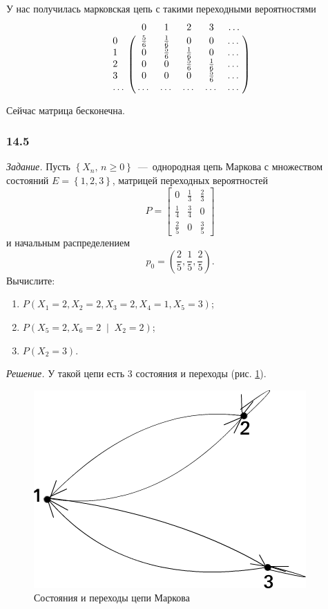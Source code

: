 \begin{enumerate}[label=\alph*)]
  У нас получилась марковская цепь с такими переходными вероятностями
  \begin{equation*}
    \bordermatrix{~ & 0 & 1 & 2 & 3 & \dotsc \cr
                  0 & \frac{5}{6} & \frac{1}{6} & 0 & 0 & \dotsc \cr
                  1 & 0 & \frac{5}{6} & \frac{1}{6} & 0 & \dotsc \cr
                  2 & 0 & 0 & \frac{5}{6} & \frac{1}{6} & \dotsc \cr
                  3 & 0 & 0 & 0 & \frac{5}{6} & \dotsc \cr
                  \dotsc & \dotsc & \dotsc & \dotsc & \dotsc & \dotsc \cr}
  \end{equation*}

  Сейчас матрица бесконечна.
\end{enumerate}

\subsubsection*{14.5}

\textit{Задание.}
Пусть $ \left\{ X_n, \, n \geq 0 \right\} $~---~однородная цепь Маркова с множеством состояний
$E = \left\{ 1, 2, 3 \right\} $, матрицей переходных вероятностей
\begin{equation*}
  P =
  \begin{bmatrix}
    0 & \frac{1}{3} & \frac{2}{3} \\
    \frac{1}{4} & \frac{3}{4} & 0 \\
    \frac{2}{5} & 0 & \frac{3}{5}
  \end{bmatrix}
\end{equation*}
и начальным распределением
\begin{equation*}
  p_0 =
  \left( \frac{2}{5}, \frac{1}{5}, \frac{2}{5} \right).
\end{equation*}
Вычислите:
\begin{enumerate}[label=\alph*)]
  \item $P \left( X_1 = 2, X_2 = 2, X_3 = 2, X_4 = 1, X_5 = 3 \right) $;
  \item $P \left( X_5 = 2, X_6 = 2 \; \middle| \; X_2 = 2 \right) $;
  \item $P \left( X_2 = 3 \right) $.
\end{enumerate}

\textit{Решение.}
У такой цепи есть 3 состояния и переходы (рис. \ref{fig:145}).

\begin{figure}[h!]
  \centering
  \includegraphics[width=.4\textwidth]{./pictures/14_5.png}
  \caption{Состояния и переходы цепи Маркова}
  \label{fig:145}
\end{figure}

